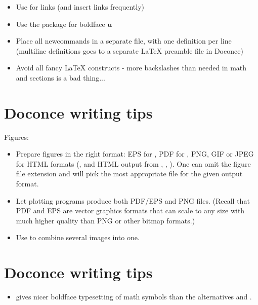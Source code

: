 \documentclass[%
twoside,                 %
draft,                   %
final,                   %
chapterprefix=true,      %
open=right               %
10pt]{book}
\newcounter{doconce:movie:counter}
\newcounter{doconce:exercise:counter}
\begin{document}
\begin{shadedquoteBlue}
\begin{itemize}
 \item Use \code{\href} for links (and insert links frequently)

 \item Use the  package for boldface $\bm{u}$

 \item Place all newcommands in a separate file, with one definition per line
   (multiline definitions goes to a separate {\LaTeX} preamble file in Doconce)

 \item Avoid all fancy {\LaTeX} constructs - more backslashes than needed in math
   and sections is a bad thing...
\end{itemize}

\noindent
\section*{Doconce writing tips}


Figures:

\begin{itemize}
 \item Prepare figures in the right format: EPS for , PDF for ,
   PNG, GIF or JPEG for HTML formats (, and HTML output from
   , , ). One can omit the figure file extension and
    will pick the most appropriate file for the given output format.

 \item Let plotting programs produce both PDF/EPS and PNG files.
   (Recall that PDF and EPS are vector graphics formats that can scale to
   any size with much higher quality than PNG or other bitmap formats.)

 \item Use  to combine several images into one.
\end{itemize}

\noindent
\section*{Doconce writing tips}

\begin{itemize}
 \item {} gives nicer boldface typesetting of math symbols than
   the alternatives  and .


\end{itemize}
\end{shadedquoteBlue}
\end{document}
